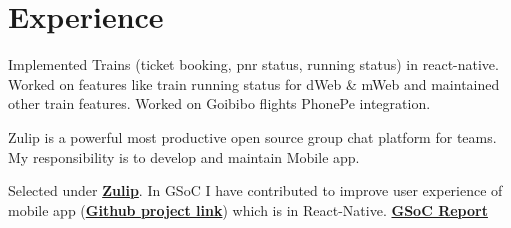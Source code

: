 \documentclass[a4paper]{deedy-resume} %
\begin{document}
    \hfill
    \begin{minipage}[t]{0.66\textwidth} %
    
    
    \section{Experience}
    
    Implemented Trains (ticket booking, pnr status, running status) in react-native. Worked on features like train running status for dWeb \& mWeb and maintained other train features. Worked on Goibibo flights PhonePe integration.
    
    \sectionspace %
    
    
    Zulip is a powerful most productive open source group chat platform for teams. My responsibility is to develop and maintain Mobile app.
    
    
    \sectionspace %
    
    
    \descript{}
    
    Selected under \href{https://zulipchat.com}{\bf Zulip}. In GSoC I have contributed to improve user experience of mobile app (\href{https://github.com/zulip/zulip-mobile}{\bf Github project link}) which is in React-Native.
    \href{https://jainkuniya.github.io/gsoc-work-report/}{\bf GSoC Report}
    

\end{minipage}
\end{document}
